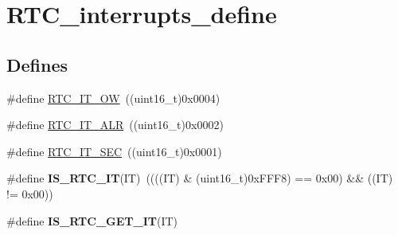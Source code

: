 \hypertarget{group__RTC__interrupts__define}{
\section{RTC\_\-interrupts\_\-define}
\label{group__RTC__interrupts__define}
}
\subsection*{Defines}
\begin{DoxyCompactItemize}
\item 
\#define \hyperlink{group__RTC__interrupts__define_gabcfefb2f22cb8ca65113c2c13d0e0640}{RTC\_\-IT\_\-OW}~((uint16\_\-t)0x0004)
\item 
\#define \hyperlink{group__RTC__interrupts__define_ga92f0316a3c69aefc2b20c3392843d3da}{RTC\_\-IT\_\-ALR}~((uint16\_\-t)0x0002)
\item 
\#define \hyperlink{group__RTC__interrupts__define_ga960bccbc10da872549cf52c03dd342f1}{RTC\_\-IT\_\-SEC}~((uint16\_\-t)0x0001)
\item 
\hypertarget{group__RTC__interrupts__define_ga5c941995b804ce4c7ef62e28e0133a83}{
\#define {\bfseries IS\_\-RTC\_\-IT}(IT)~((((IT) \& (uint16\_\-t)0xFFF8) == 0x00) \&\& ((IT) != 0x00))}
\label{group__RTC__interrupts__define_ga5c941995b804ce4c7ef62e28e0133a83}

\item 
\#define {\bfseries IS\_\-RTC\_\-GET\_\-IT}(IT)
\end{DoxyCompactItemize}


